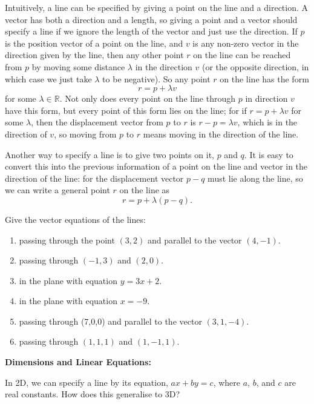 \documentclass{article}
\begin{document}
Intuitively, a line can be specified by giving a point on the line and a direction. A vector has both a direction and a length, so giving a point and a vector should specify a line if we ignore the length of the vector and just use the direction. If $p$ is the position vector of a point on the line, and $v$ is any non-zero vector in the direction given by the line, then any other point $r$ on the line can be reached from $p$ by moving some distance $\lambda$ in the direction $v$ (or the opposite direction, in which case we just take $\lambda$ to be negative). So any point $r$ on the line has the form
\[r=p+\lambda v\]
for some $\lambda\in\mathbb{R}$. Not only does every point on the line through $p$ in direction $v$ have this form, but every point of this form lies on the line; for if $r=p+\lambda v$ for some $\lambda$, then the displacement vector from $p$ to $r$ is $r-p=\lambda v$, which is in the direction of $v$, so moving from $p$ to $r$ means moving in the direction of the line.

Another way to specify a line is to give two points on it, $p$ and $q$. It is easy to convert this into the previous information of a point on the line and vector in the direction of the line: for the displacement vector $p-q$ must lie along the line, so we can write a general point $r$ on the line as
\[r=p+\lambda(p-q).\]

Give the vector equations of the lines:
\begin{enumerate}
	\item passing through the point $(3,2)$ and parallel to the vector $(4,-1)$.
	\item passing through $(-1,3)$ and $(2,0)$.
	\item in the plane with equation $y=3x+2$.
	\item in the plane with equation $x=-9$.
	\item passing through (7,0,0) and parallel to the vector $(3,1,-4)$.
	\item passing through $(1,1,1)$ and $(1,-1,1)$.
\end{enumerate}



\clearpage











\textbf{Dimensions and Linear Equations:}\bigskip


In 2D, we can specify a line by its equation, $ax+by=c$, where $a$, $b$, and $c$ are real constants. How does this generalise to 3D?
\end{document}
